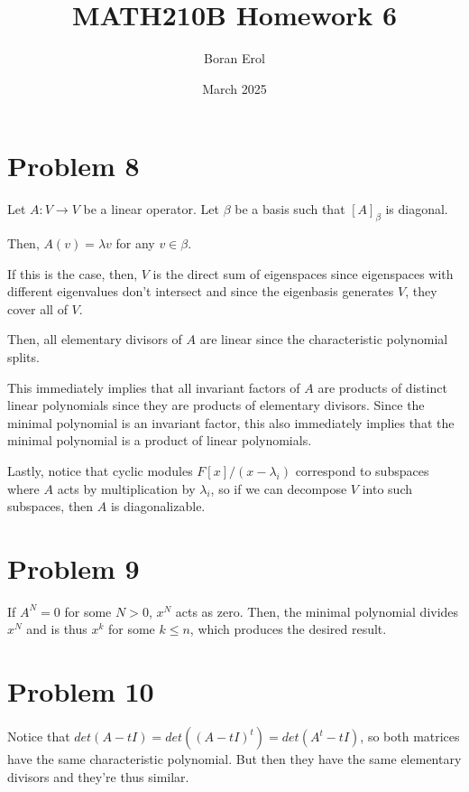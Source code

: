 \documentclass{article}
\title{MATH210B Homework 6}
\date{March 2025}
\author{Boran Erol}
\theoremstyle{definition}
\begin{document}
\maketitle

\section{Problem 8}

Let $ A : V \to V $ be a linear operator. Let $ \beta $ be a basis such that
$ [A]_{\beta} $ is diagonal.

Then, $ A(v) = \lambda v $ for any $ v \in \beta $.

If this is the case, then, $ V $ is the direct sum of eigenspaces since
eigenspaces with different eigenvalues don't intersect and since the eigenbasis generates $ V $,
they cover all of $ V $.

Then, all elementary divisors of $ A $ are linear since the characteristic polynomial splits.

This immediately implies that all invariant factors of $ A $ are products of distinct linear polynomials
since they are products of elementary divisors. Since the minimal polynomial is an invariant factor,
this also immediately implies that the minimal polynomial is a product of linear polynomials.

Lastly, notice that cyclic modules $ F[x] / (x - \lambda_{i}) $ correspond to subspaces where $ A $ acts by
multiplication by $ \lambda_{i} $, so if we can decompose $ V $ into such subspaces, then $ A $ is diagonalizable.


\section{Problem 9}

If $ A^{N} = 0 $ for some $ N > 0 $, $ x^{N} $ acts as zero. Then,
the minimal polynomial divides $ x^{N} $ and is thus $ x^{k} $ for some
$ k \leq n $, which produces the desired result.
 
\section{Problem 10}

Notice that $ det(A - tI) = det((A - tI)^{t}) = det(A^{t} - tI) $, so both matrices
have the same characteristic polynomial. But then they have the same elementary divisors
and they're thus similar.
\end{document}
